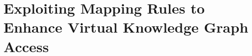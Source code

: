 
\chapter{Exploiting Mapping Rules to Enhance Virtual Knowledge Graph Access}
\label{chapter:virtual}





